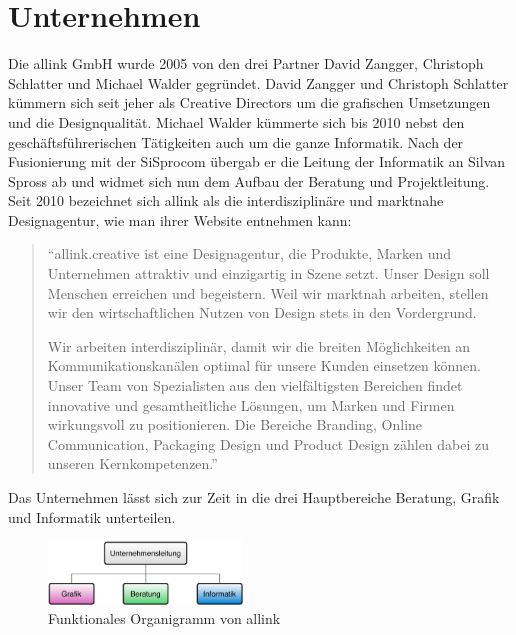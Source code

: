 \section{Unternehmen}
Die allink GmbH wurde 2005 von den drei Partner David Zangger, Christoph Schlatter
und Michael Walder gegründet. David Zangger und Christoph Schlatter kümmern sich
seit jeher als Creative Directors um die grafischen Umsetzungen und die Designqualität.
Michael Walder kümmerte sich bis 2010 nebst den geschäftsführerischen Tätigkeiten
auch um die ganze Informatik. Nach der Fusionierung mit der SiSprocom übergab
er die Leitung der Informatik an Silvan Spross ab und widmet sich nun dem Aufbau der
Beratung und Projektleitung. Seit 2010 bezeichnet sich allink als die interdisziplinäre 
und marktnahe Designagentur, wie man ihrer Website entnehmen kann:

\begin{quote}
``allink.creative ist eine Designagentur, die Produkte, Marken und Unternehmen 
attraktiv und einzigartig in Szene setzt. Unser Design soll Menschen erreichen 
und begeistern. Weil wir marktnah arbeiten, stellen wir den wirtschaftlichen 
Nutzen von Design stets in den Vordergrund.

Wir arbeiten interdisziplinär, damit wir die breiten Möglichkeiten an 
Kommunikationskanälen optimal für unsere Kunden einsetzen können. Unser 
Team von Spezialisten aus den vielfältigsten Bereichen findet innovative 
und gesamtheitliche Lösungen, um Marken und Firmen wirkungsvoll zu positionieren. 
Die Bereiche Branding, Online Communication, Packaging Design und Product 
Design zählen dabei zu unseren Kernkompetenzen.''
\end{quote}

Das Unternehmen lässt sich zur Zeit in die drei Hauptbereiche Beratung, Grafik
und Informatik unterteilen.

\begin{figure}[htbp]
\begin{center}
\includegraphics[width=0.46\textwidth,angle=0]{./bilder/analyse/04_funktionales_organigramm.pdf}
\caption{Funktionales Organigramm von allink}
\label{pic:04_funktionales_organigramm}
\end{center}
\end{figure}

